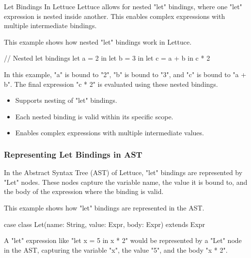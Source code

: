 \begin{notes}{Let Bindings In Lettuce}
    Lettuce allows for nested "let" bindings, where one "let" expression is nested inside another. This enables complex expressions with multiple intermediate bindings.
    
    \begin{highlight}
    
        This example shows how nested "let" bindings work in Lettuce.
    
    \begin{code}[Lettuce]
    // Nested let bindings
    let a = 2 in
    let b = 3 in
    let c = a + b in
    c * 2
    \end{code}
    
        In this example, "a" is bound to "2", "b" is bound to "3", and "c" is bound to "a + b". The final expression "c * 2" is evaluated using these nested bindings.
        
        \begin{itemize}
            \item Supports nesting of "let" bindings.
            \item Each nested binding is valid within its specific scope.
            \item Enables complex expressions with multiple intermediate values.
        \end{itemize}
    
    \end{highlight}
    
    \subsubsection*{Representing Let Bindings in AST}
    
    In the Abstract Syntax Tree (AST) of Lettuce, "let" bindings are represented by "Let" nodes. These nodes capture the variable name, the value it is bound to, and the body of the expression where 
    the binding is valid.
    
    \begin{highlight}
    
        This example shows how "let" bindings are represented in the AST.
    
    \begin{code}[Scala]
    case class Let(name: String, value: Expr, body: Expr) extends Expr
    \end{code}
    
        A "let" expression like "let x = 5 in x * 2" would be represented by a "Let" node in the AST, capturing the variable "x", the value "5", and the body "x * 2".
        

\end{highlight}
\end{notes}

